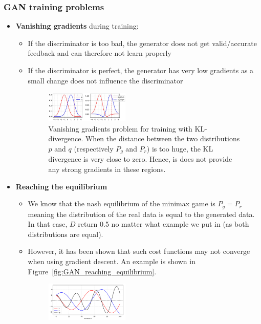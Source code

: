 \subsubsection{GAN training problems}
\begin{itemize}
	\item \textbf{Vanishing gradients} during training:
	\begin{itemize}
		\item If the discriminator is too bad, the generator does not get valid/accurate feedback and can therefore not learn properly
		\item If the discriminator is perfect, the generator has very low gradients as a small change does not influence the discriminator
		\begin{figure}[ht!]
			\centering
			\includegraphics[width=0.4\textwidth]{figures/cv_deep_learning_GAN_vanishing_gradients.jpeg}
			\caption{Vanishing gradients problem for training with KL-divergence. When the distance between the two distributions $p$ and $q$ (respectively $P_g$ and $P_r$) is too huge, the KL divergence is very close to zero. Hence, is does not provide any strong gradients in these regions.}
		\end{figure}
	\end{itemize}
	\item \textbf{Reaching the equilibrium}
	\begin{itemize}
		\item We know that the nash equilibrium of the minimax game is $P_g=P_r$ meaning the distribution of the real data is equal to the generated data. In that case, $D$ return 0.5 no matter what example we put in (as both distributions are equal).
		\item However, it has been shown that such cost functions may not converge when using gradient descent. An example is shown in Figure~\ref{fig:GAN_reaching_equilibrium}.
		\begin{figure}[ht!]
			\centering
			\includegraphics[width=0.4\textwidth]{figures/cv_deep_learning_GAN_oscillating.png}

\end{figure}
\end{itemize}
\end{itemize}
